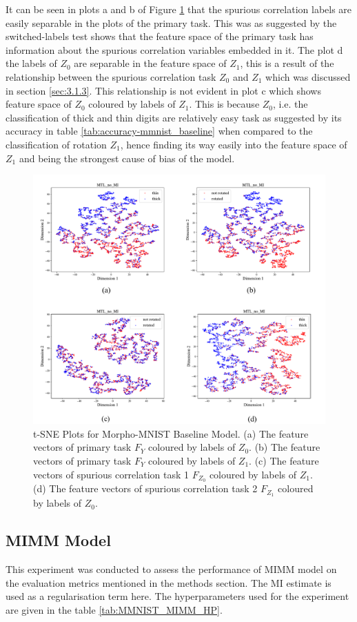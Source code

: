 \documentclass[12pt,DIV14,BCOR12mm,a4paper,footinclude=false,headinclude,parskip=half-,twoside,openright,cleardoublepage=empty,toc=index,bibliography=totoc,listof=totoc]{scrreprt}
\numberwithin{equation}{chapter}
\begin{document}
It can be seen in plots a and b of Figure \ref{fig:tsne-mnist-baseline} that the spurious correlation labels are easily separable in the plots of the primary task. This was as suggested by the switched-labels test shows that the feature space of the primary task has information about the spurious correlation variables embedded in it. The plot d the labels of $Z_0$ are separable in the feature space of $Z_1$, this is a result of the relationship between the spurious correlation task $Z_0$ and $Z_1$ which was discussed in section \ref{sec:3.1.3}. This relationship is not evident in plot c which shows feature space of $Z_0$ coloured by labels of $Z_1$. This is because $Z_0$, i.e. the classification of thick and thin digits are relatively easy task as suggested by its accuracy in table \ref{tab:accuracy-mmnist_baseline} when compared to the classification of rotation $Z_1$, hence finding its way easily into the feature space of $Z_1$ and being the strongest cause of bias of the model.
\begin{figure}[H]
\centering
\includegraphics[width=0.7\linewidth]{thesis/figures/tsne_mnist_balanced.pdf}
\caption{t-SNE Plots for Morpho-MNIST Baseline Model. (a) The feature vectors of primary task $F_Y$ coloured by labels of $Z_0$. (b) The feature vectors of primary task $F_Y$ coloured by labels of $Z_1$. (c) The feature vectors of spurious correlation task 1 $F_{Z_0}$ coloured by labels of $Z_1$. (d) The feature vectors of spurious correlation task 2 $F_{Z_1}$ coloured by labels of $Z_0$.}
\label{fig:tsne-mnist-baseline}
\end{figure}

\subsection{MIMM Model}
This experiment was conducted to assess the performance of MIMM model on the evaluation metrics mentioned in the methods section. The MI estimate is used as a regularisation term here. The hyperparameters used for the experiment are given in the table \ref{tab:MMNIST_MIMM_HP}. 
\end{document}
